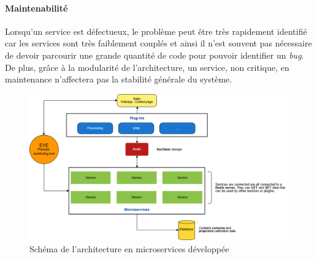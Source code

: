 \paragraph{Maintenabilité} Lorsqu'un service est défectueux, le problème peut être très rapidement identifié car les services sont très faiblement couplés et ainsi il n'est souvent pas nécessaire de devoir parcourir une grande quantité de code pour pouvoir identifier un \emph{bug}. De plus, grâce à la modularité de l'architecture, un service, non critique, en maintenance n'affectera pas la stabilité générale du système.

\begin{figure}[H]
\centering
\includegraphics[width=\linewidth]{images/archi3}
\caption{Schéma de l'architecture en microservices développée}
\label{fig:microarchi}
\end{figure} 

